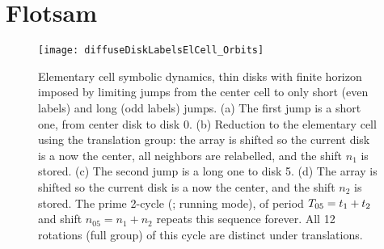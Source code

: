 \section{Flotsam}

\begin{figure}
\begin{center}
\texttt{[image: diffuseDiskLabelsElCell\_Orbits]}
\end{center}
\caption{
Elementary cell symbolic dynamics, thin disks with  finite horizon
imposed by limiting jumps from the center cell to only short (even
labels) and long (odd labels) jumps.
(a) The first jump is a short one, from center disk to disk 0.
(b) Reduction to the elementary cell using the translation group:
the array is shifted so the current disk is a now the
center, all neighbors are relabelled, and the shift $n_1$
is stored.
(c) The second jump is a long one to disk 5.
(d) The array is shifted so the current disk is a now the center, and the
shift $n_2$ is stored. The prime 2-cycle  (\rpo; running mode),
of period ${T_{05}}=t_1+t_2$ and shift $n_{05} = n_1+n_2$
repeats this sequence forever. All 12 rotations (full  group) of
this cycle are distinct under translations.
    }
\label{diskLabelsElCell}
\end{figure}


